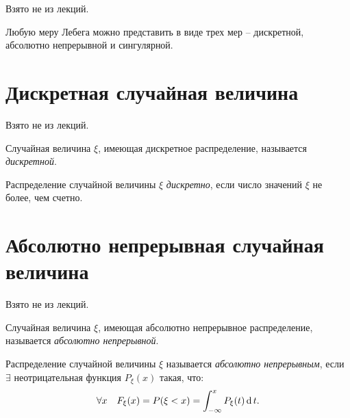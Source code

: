 \begin{note}
	Взято не из лекций.
\end{note}

\begin{theorem}
	Любую меру Лебега можно представить в виде трех мер -- дискретной, абсолютно непрерывной и сингулярной.
\end{theorem}

\newpage

\section{Дискретная случайная величина}

\begin{note}
	Взято не из лекций.
\end{note}

\begin{definition}
	Случайная величина $\xi $, имеющая дискретное распределение, называется \emph{дискретной}.

	Распределение случайной величины $\xi $ \emph{дискретно}, если число значений $\xi $ не более, чем счетно.
\end{definition}

\section{Абсолютно непрерывная случайная величина}

\begin{note}
	Взято не из лекций.
\end{note}

\begin{definition}
	Случайная величина $\xi $, имеющая абсолютно непрерывное распределение, называется \emph{абсолютно непрерывной}.

	Распределение случайной величины $\xi $ называется \emph{абсолютно непрерывным}, если $\exists $ неотрицательная функция $P_{\xi } (x)$ такая, что:
	\[
		\forall x \quad F_{\xi } (x) = P(\xi < x) = \int_{-\infty }^{x} P_{\xi } (t)\operatorname{d} t.
	\]
\end{definition}
